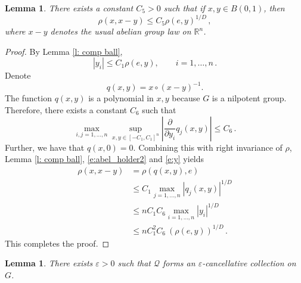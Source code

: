 \documentclass[12pt,reqno,a4paper,dvipsnames]{amsart}
\theoremstyle{plain}
\newtheorem{lemma}[theorem]{Lemma}
\theoremstyle{definition}
\numberwithin{theorem}{section}
\numberwithin{equation}{section}
\newcommand{\R}{\mathbb{R}}
\newcommand{\AD}{D}
\begin{document}
\begin{lemma}\label{l:abel_holder}
    There exists a constant $C_5 > 0$ such that if $x,y \in B(0,1)$, then 
    \begin{equation}\label{e:abel_holder}
        \rho(x, x-y) \le C_5 \rho(e,y)^{1/\AD}\,,
    \end{equation}
    where $x - y$ denotes the usual abelian group law on $\R^n$.
\end{lemma}

\begin{proof}
    By Lemma \ref{l: comp ball},
    \begin{equation}\label{e:y}
        |y_i| \le C_1\rho(e,y), \qquad i = 1, \dotsc, n\,.
    \end{equation}
    Denote
    \[
        q(x,y) = x \circ (x - y)^{-1}.
    \]
    The function $q(x,y)$ is a polynomial in $x, y$ because $G$ is a nilpotent group. Therefore, there exists a constant $C_6$ such that 
    \begin{equation}\label{e:abel_holder2}
        \max_{i,j = 1, \dotsc, n} \sup_{x, y \in [-C_1, C_1]^n} |\frac{\partial}{\partial y_i} q_j(x,y)| \le C_6\,.
    \end{equation}
    Further, we have that $q(x,0) = 0$. Combining this with right invariance of $\rho$, Lemma \ref{l: comp ball}, \eqref{e:abel_holder2} and \eqref{e:y} yields
    \begin{align*}  
        \rho(x,x-y) &= \rho( q(x,y), e)\\
        &\le C_1 \max_{j=1,\dotsc, n} |q_j(x,y)|^{1/\AD}\\
        &\le nC_1 C_6 \max_{i = 1, \dotsc, n} |y_i|^{1/\AD}\\
        &\le n C_1^2 C_6 \ (\rho(e, y))^{1/\AD}\,.
    \end{align*}
    This completes the proof.
\end{proof}

\begin{lemma}
There exists $\varepsilon > 0$ such that $\mathcal{Q}$ forms an $\varepsilon$-cancellative collection on $G$. 
\end{lemma}
\end{document}
